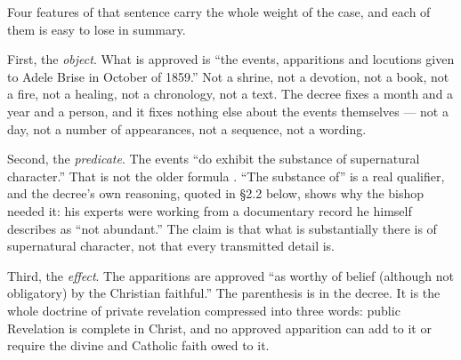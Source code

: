 Four features of that sentence carry the whole weight of the case, and
each of them is easy to lose in summary.

First, the \emph{object}. What is approved is ``the events, apparitions
and locutions given to Adele Brise in October of 1859.'' Not a shrine,
not a devotion, not a book, not a fire, not a healing, not a
chronology, not a text. The decree fixes a month and a year and a
person, and it fixes nothing else about the events themselves --- not a
day, not a number of appearances, not a sequence, not a wording.

Second, the \emph{predicate}. The events ``do exhibit the substance of
supernatural character.'' That is not the older formula . ``The substance of'' is a real qualifier, and
the decree's own reasoning, quoted in \S2.2 below, shows why the bishop
needed it: his experts were working from a documentary record he
himself describes as ``not abundant.'' The claim is that what is
substantially there is of supernatural character, not that every
transmitted detail is.

Third, the \emph{effect}. The apparitions are approved ``as worthy of
belief (although not obligatory) by the Christian faithful.'' The
parenthesis is in the decree. It is the whole doctrine of private
revelation compressed into three words: public Revelation is complete
in Christ, and no approved apparition can add to it or require the
divine and Catholic faith owed to it.

